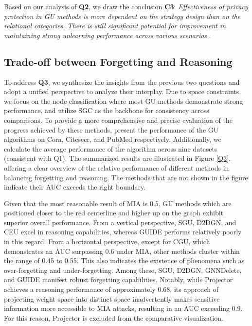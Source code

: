 Based on our analysis of \textbf{Q2}, we draw the conclusion \textbf{C3}: \textit{Effectiveness of privacy protection in GU methods is more dependent on the strategy design than on the relational categories. There is still significant potential for improvement in maintaining strong unlearning performance across various scenarios} \cite{privacy1,privacy2}.



\vspace{-0.5cm}

\subsection{Trade-off between Forgetting and Reasoning}
To address \textbf{Q3}, we synthesize the insights from the previous two questions and adopt a unified perspective to analyze their interplay.
Due to space constraints, we focus on the node classification where most GU methods demonstrate strong performance, and utilize SGC as the backbone for consistency across comparisons. To provide a more comprehensive and precise evaluation of the progress achieved by these methods, present the performance of the GU algorithms on Cora, Citeseer, and PubMed respectively. Additionally, we calculate the average performance of the algorithm across nine datasets (consistent with Q1). The summarized results are illustrated in Figure \ref{Q3}, offering a clear overview of the relative performance of different methods in balancing forgetting and reasoning. The methods that are not shown in the figure indicate their AUC exceeds the right boundary.


Given that the most reasonable result of MIA is 0.5, GU methods which are positioned closer to the red centerline and higher up on the graph exhibit superior overall performance. From a vertical perspective, SGU, D2DGN, and CEU excel in reasoning capabilities, whereas GUIDE performs relatively poorly in this regard. From a horizontal perspective, except for CGU, which demonstrates an AUC surpassing 0.6 under MIA, other methods cluster within the range of 0.45 to 0.55. This also indicates the existence of phenomena such as over-forgetting and under-forgetting. Among these, SGU, D2DGN, GNNDelete, and GUIDE manifest robust forgetting capabilities. Notably, while Projector achieves a reasoning performance of approximately 0.68, its approach of projecting weight space into distinct space inadvertently makes sensitive information more accessible to MIA attacks, resulting in an AUC exceeding 0.9. For this reason, Projector is excluded from the comparative visualization. 



